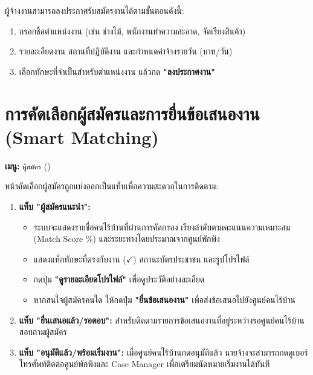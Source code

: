 \documentclass[12pt,a4paper]{report}
\newcommand{\codeinline}[1]{{\ttfamily\path{#1}}}
\begin{document}
ผู้จ้างงานสามารถลงประกาศรับสมัครงานได้ตามขั้นตอนดังนี้:

\begin{enumerate}
    \item กรอกชื่อตำแหน่งงาน (เช่น ช่างไม้, พนักงานทำความสะอาด, จัดเรียงสินค้า)
    \item รายละเอียดงาน สถานที่ปฏิบัติงาน และกำหนดค่าจ้างรายวัน (บาท/วัน)
    \item เลือกทักษะที่จำเป็นสำหรับตำแหน่งงาน แล้วกด \textbf{"ลงประกาศงาน"}
\end{enumerate}

\section{การคัดเลือกผู้สมัครและการยื่นข้อเสนองาน (Smart Matching)}
\textbf{เมนู:} \texttt{ผู้สมัคร} (\codeinline{/employer/matches})

หน้าคัดเลือกผู้สมัครถูกแบ่งออกเป็นแท็บเพื่อความสะดวกในการติดตาม:

\begin{enumerate}
    \item \textbf{แท็บ "ผู้สมัครแนะนำ":}
    \begin{itemize}
        \item ระบบจะแสดงรายชื่อคนไร้บ้านที่ผ่านการคัดกรอง เรียงลำดับตามคะแนนความเหมาะสม (Match Score \%) และระยะทางโดยประมาณจากศูนย์พักพิง
        \item แสดงแท็กทักษะที่ตรงกับงาน ($\checkmark$) สถานะบัตรประชาชน และรูปโปรไฟล์
        \item กดปุ่ม \textbf{"ดูรายละเอียดโปรไฟล์"} เพื่อดูประวัติอย่างละเอียด
        \item หากสนใจผู้สมัครคนใด ให้กดปุ่ม \textbf{"ยื่นข้อเสนองาน"} เพื่อส่งข้อเสนอไปยังศูนย์คนไร้บ้าน
    \end{itemize}

    \item \textbf{แท็บ "ยื่นเสนอแล้ว/รอตอบ":} สำหรับติดตามรายการข้อเสนองานที่อยู่ระหว่างรอศูนย์คนไร้บ้านสอบถามผู้สมัคร
    \item \textbf{แท็บ "อนุมัติแล้ว/พร้อมเริ่มงาน":} เมื่อศูนย์คนไร้บ้านกดอนุมัติแล้ว นายจ้างจะสามารถกดดูเบอร์โทรศัพท์ติดต่อศูนย์พักพิงและ Case Manager เพื่อเตรียมนัดหมายเริ่มงานได้ทันที
\end{enumerate}
\end{document}
